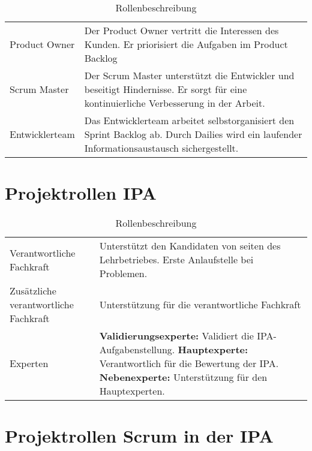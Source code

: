 \begin{table}[h!]
    \begin{tabular}{|L{0.4\textwidth}|L{0.5\textwidth}|}
        \hline
          \\[12pt]
        \hline
        Product Owner & Der Product Owner vertritt die Interessen des Kunden. Er priorisiert die Aufgaben im Product Backlog  \\
        \hline
        Scrum Master & Der Scrum Master unterstützt die Entwickler und beseitigt Hindernisse. Er sorgt für eine 
        kontinuierliche Verbesserung in der Arbeit. \\
        \hline
        Entwicklerteam & Das Entwicklerteam arbeitet selbstorganisiert den Sprint Backlog ab. 
        Durch Dailies wird ein laufender Informationsaustausch sichergestellt. \\
        \hline
      \end{tabular}
      \caption{Rollenbeschreibung}
\end{table}

\section{Projektrollen IPA}
\begin{table}[h!]
    \begin{tabular}{|L{0.4\textwidth}|L{0.5\textwidth}|}
        \hline
          \\[12pt]
        \hline
        Verantwortliche Fachkraft & Unterstützt den Kandidaten von seiten des Lehrbetriebes. Erste Anlaufstelle bei Problemen.  \\
        \hline
        Zusätzliche verantwortliche Fachkraft & Unterstützung für die verantwortliche Fachkraft \\
        \hline
        Experten & \textbf{Validierungsexperte:} Validiert die IPA-Aufgabenstellung.
                    \textbf{Hauptexperte:} Verantwortlich für die Bewertung der IPA.
                    \textbf{Nebenexperte:} Unterstützung für den Hauptexperten. \\ 
        \hline
      \end{tabular}
      \caption{Rollenbeschreibung}
\end{table}

\newpage

\section{Projektrollen Scrum in der IPA}

